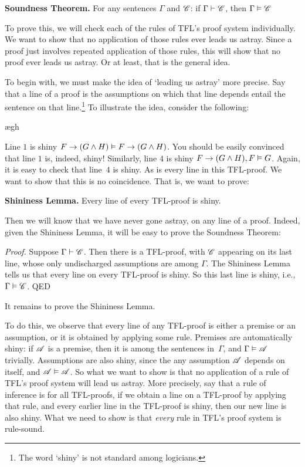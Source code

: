\begin{factoidboxe}\textbf{Soundness Theorem.} For any sentences $\Gamma$ and $\mathscr{C}$: if $\Gamma\vdash\mathscr{C}$, then $\Gamma \vDash\mathscr{C}$
\end{factoidboxe}

To prove this, we will check each of the rules of TFL's proof system individually. We want to show that no application of those rules ever leads us astray. Since a proof just involves repeated application of those rules, this will show that no proof ever leads us astray. Or at least, that is the general idea.

To begin with, we must make the idea of `leading us astray' more precise. Say that a line of a proof is  \ifeff{} the assumptions on which that line depends entail the sentence on that line.\footnote{The word `shiny' is not standard among logicians.} To illustrate the idea, consider the following:
	\begin{fitchproof}
		\PR
		\open
			\AS
			\ae{gh}
		\close
	\end{fitchproof}\noindent\noindent
Line $1$ is shiny \ifeff{} $F \rightarrow (G \wedge H) \vDash F \rightarrow (G \wedge H)$. You should be easily convinced that line $1$ is, indeed, shiny! Similarly, line $4$ is shiny \ifeff{} $F \rightarrow (G \wedge H), F \vDash G$. Again, it is easy to check that line~$4$ is shiny. As is every line in this TFL-proof. We want to show that this is no coincidence. That is, we want to prove:
	\begin{factoidboxe}\textbf{Shininess Lemma.}
		Every line of every TFL-proof is shiny.
	\end{factoidboxe}\noindent
Then we will know that we have never gone astray, on any line of a proof. Indeed, given the Shininess Lemma, it will be easy to prove the Soundness Theorem:

\emph{Proof.} Suppose $\Gamma \vdash \mathscr{C}$. Then there is a TFL-proof, with $\mathscr{C}$ appearing on its last line, whose only undischarged assumptions are among $\Gamma$. The Shininess Lemma tells us that every line on every TFL-proof is shiny. So this last line is shiny, i.e., $\Gamma \vDash \mathscr{C}$. QED

It remains to prove the Shininess Lemma.

To do this, we observe that every line of any TFL-proof is either a
premise or an assumption, or it is obtained by applying some rule.
Premises are automatically shiny: if $\mathscr{A}$ is a premise, then it
is among the sentences in~$\Gamma$, and $\Gamma \vDash \mathscr{A}$
trivially. Assumptions are also shiny, since the any assumption
$\mathscr{A}$ depends on itself, and $\mathscr{A} \vDash \mathscr{A}$. So
what we want to show is that no application of a rule of TFL's proof
system will lead us astray. More precisely, say that a rule of
inference is  \emph{\ifeff} for all TFL-proofs, if
we obtain a line on a TFL-proof by applying that rule, and every
earlier line in the TFL-proof is shiny, then our new line is also
shiny. What we need to show is that \emph{every} rule in TFL's proof
system is rule-sound.

